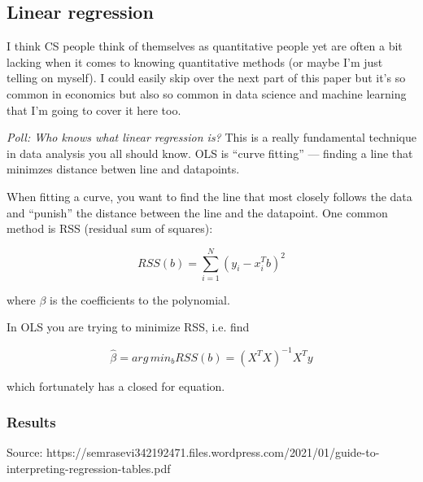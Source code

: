 \documentclass[11pt]{article}
\begin{document}
\subsection{Linear regression}

I think CS people think of themselves as quantitative people yet are often a bit lacking when it comes to knowing quantitative methods (or maybe I'm just telling on myself). I could easily skip over the next part of this paper but it's so common in economics but also so common in data science and machine learning that I'm going to cover it here too. 

{\it Poll: Who knows what linear regression is?} This is a really fundamental technique in data analysis you all should know. 
OLS is ``curve fitting'' --- finding a line that minimzes distance betwen line and datapoints. 

When fitting a curve, you want to find the line that most closely follows the data and ``punish'' the distance between the line and the datapoint. One common method is RSS (residual sum of squares):

$$ RSS(b) = \sum_{i=1}^N (y_i - x_i^{T}b)^2 $$ 

where $\beta$ is the coefficients to the polynomial. 

In OLS you are trying to minimize RSS, i.e. find 

$$ \hat{\beta} = arg\,min_b RSS(b) = (X^{T}X)^{-1}X^{T}y$$

which fortunately has a closed for equation. 

\subsubsection{Results}

Source: https://semrasevi342192471.files.wordpress.com/2021/01/guide-to-interpreting-regression-tables.pdf
\end{document}
